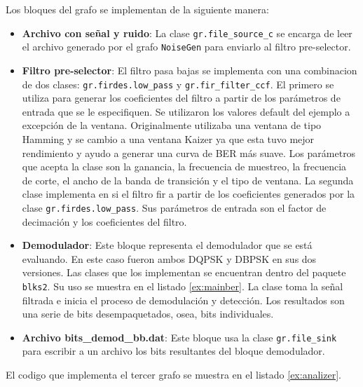 Los bloques del grafo se implementan de la siguiente manera:

\begin{itemize}
  \item \textbf{Archivo con se\~nal y ruido}: La clase \verb|gr.file_source_c| se encarga de leer el
  archivo generado por el grafo \verb|NoiseGen| para enviarlo al filtro pre-selector.
  \item \textbf{Filtro pre-selector}: El filtro pasa bajas se implementa con una combinacion de dos
  clases: \verb|gr.firdes.low_pass| y \verb|gr.fir_filter_ccf|. El primero se utiliza para generar
  los coeficientes del filtro a partir de los par\'ametros de entrada que se le especifiquen. Se
  utilizaron los valores default del ejemplo a excepci\'on de la ventana. Originalmente utilizaba
  una ventana de tipo Hamming y se cambio a una ventana Kaizer ya que esta tuvo mejor rendimiento y
  ayudo a generar una curva de BER m\'as suave. Los par\'ametros que acepta la clase son la
  ganancia, la frecuencia de muestreo, la frecuencia de corte, el ancho de la banda de transici\'on
  y el tipo de ventana. La segunda clase implementa en si el filtro fir a partir de los coeficientes
  generados por la clase \verb|gr.firdes.low_pass|. Sus par\'ametros de entrada son el factor de
  decimaci\'on y los coeficientes del filtro.
  \item \textbf{Demodulador}: Este bloque representa el demodulador que se est\'a evaluando. En este
  caso fueron ambos DQPSK y DBPSK en sus dos versiones. Las clases que los implementan se encuentran
  dentro del paquete \verb|blks2|. Su uso se muestra en el listado \ref{ex:mainber}. La clase toma
  la se\~nal filtrada e inicia el proceso de demodulaci\'on y detecci\'on. Los resultados son una serie de bits
  desempaquetados, osea, bits individuales.
  \item \textbf{Archivo bits\_demod\_bb.dat}: Este bloque usa la clase \verb|gr.file_sink| para
  escribir a un archivo los bits resultantes del bloque demodulador.
\end{itemize}

El codigo que implementa el tercer grafo se muestra en el listado \ref{ex:analizer}.

